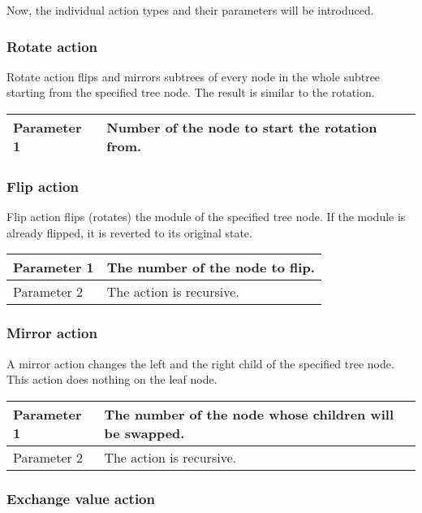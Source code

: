 Now, the individual action types and their parameters will be introduced.

\subsubsection{Rotate action}

Rotate action flips and mirrors subtrees of every node in the whole subtree starting from the specified tree node. The result is similar to the rotation.

\noindent
\begin{tabular}{|l|l|}
\hline
Parameter 1 & Number of the node to start the rotation from. \\
\hline
\end{tabular}

\subsubsection{Flip action}

Flip action flips (rotates) the module of the specified tree node. If the module is already flipped, it is reverted to its original state.

\noindent
\begin{tabular}{|l|l|}
\hline
Parameter 1 & The number of the node to flip. \\
\hline
Parameter 2 & The action is recursive. \\
\hline
\end{tabular}

\subsubsection{Mirror action}

A mirror action changes the left and the right child of the specified tree node. This action does nothing on the leaf node.

\noindent
\begin{tabular}{|l|l|}
\hline
Parameter 1 & The number of the node whose children will be swapped. \\
\hline
Parameter 2 & The action is recursive. \\
\hline
\end{tabular}

\subsubsection{Exchange value action}

